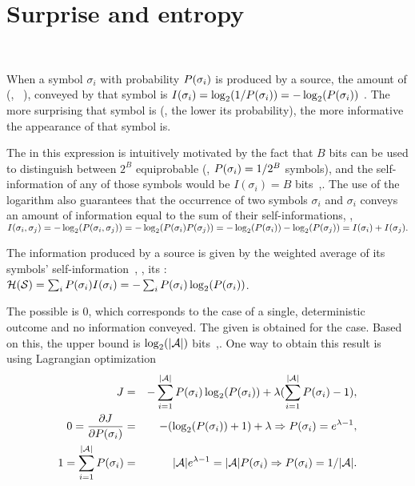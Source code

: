 \section{Surprise and entropy}~\label{sec:info:surprise}

When a symbol $\sigma_i$ with probability $P(\sigma_i)$ is produced by a source, the amount
of  (, \aka\ ),
conveyed by that symbol is
$I(\sigma_i) = \log_2(1/P(\sigma_i)) = -\log_2(P(\sigma_i))$
. The more surprising that symbol is (\ie, the lower its probability),
the more informative the appearance of that symbol is.

The  in this expression is intuitively motivated by the fact that $B$ bits can be used
to distinguish between $2^B$ equiprobable (\ie, $P(\sigma_i) = 1/2^B$ symbols), and
the self-information of any of those symbols would be
$I(\sigma_i) = B$ bits~\cite[\S 2.2]{sayood_introduction},\cite[\S VI]{shannon_communication}.
The use of the logarithm also guarantees that the occurrence of two  symbols
$\sigma_i$ and $\sigma_i$ conveys an amount of information equal to the sum of their
self-informations, \ie,
$I(\sigma_i, \sigma_j) = -\log_2(P(\sigma_i,\sigma_j))
= -\log_2(P(\sigma_i) P(\sigma_j)) = -\log_2(P(\sigma_i)) -\log_2(P(\sigma_j)) = I(\sigma_i) + I(\sigma_j).$

The information produced by a  source is given by the weighted average of
its symbols' self-information~\cite{shannon_communication}, \ie, its :
$\mathcal{H}(\mathcal{S}) = \sum_i P(\sigma_i) I(\sigma_i) = - \sum_i P(\sigma_i) \log_2(P(\sigma_i))$.

The  possible is $0$, which corresponds to the case of a single, deterministic outcome
and no information conveyed.
%
The  given \alphabet is obtained for the 
case.
%
Based on this, the upper bound is $\log_2(|\mathcal{A}|)$
bits~\cite[Theorem 2.6.4]{cover_elements},\cite[\S 2.1.2]{taubman2002jpeg2000}.
%
One way to obtain this result is using Lagrangian optimization
\begin{eqnarray*}
J &=& - \sum_{i=1}^{|\mathcal{A}|} P(\sigma_i) \log_2(P(\sigma_i)) + \lambda (\sum_{i=1}^{|\mathcal{A}|} P(\sigma_i) - 1), \\
0 = \frac{\partial J}{\partial P(\sigma_i)} &=& -(\log_2(P(\sigma_i)) + 1) + \lambda
\Rightarrow  P(\sigma_i) = e^{\lambda - 1}, \\
1 = \sum_{i=1}^{|\mathcal{A}|} P(\sigma_i) &=& |\mathcal{A}| e^{\lambda-1} = |\mathcal{A}| P(\sigma_i)
\Rightarrow  P(\sigma_i) = 1/|\mathcal{A}|.
\end{eqnarray*}

